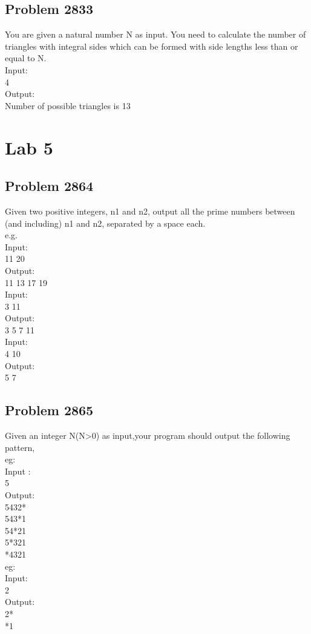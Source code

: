 \subsection{Problem 2833}

You are given a natural number N as input. You need to calculate the number of triangles with integral sides which can be formed with side lengths less than or equal to N.
\\Input:
\\4
\\Output:
\\Number of possible triangles is 13

\section{Lab 5}

\subsection{Problem 2864}

Given two positive integers, n1 and n2, output all the prime numbers between (and including) n1 and n2, separated by a space each.
\\e.g.
\\Input:
\\11 20
\\Output:
\\11 13 17 19
\\Input:
\\3 11
\\Output:
\\3 5 7 11
\\Input:
\\4 10
\\Output:
\\5 7

\subsection{Problem 2865}

Given an integer N(N>0) as input,your program should output the following pattern,
\\eg:
\\Input :
\\5
\\Output:
\\5432*
\\543*1
\\54*21
\\5*321
\\*4321
\\eg:
\\Input:
\\2
\\Output:
\\2*
\\*1

